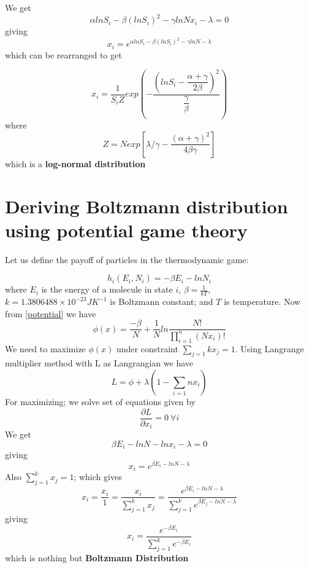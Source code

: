 \documentclass[letterpaper,english,10pt]{article}
\begin{document}
 We get 
 \begin{equation}
    \alpha ln S_i-\beta (ln S_i)^2 - \gamma ln Nx_i - \lambda = 0
 \end{equation}
 giving
 \begin{equation}
     x_i = e ^ {\alpha ln S_i - \beta (ln S_i)^2 - \gamma ln N -\lambda}
 \end{equation}
 which can be rearranged to get
 
 \begin{equation}\label{fairpotential}
     x_i = \dfrac{1}{S_i Z}exp(-\dfrac{(lnS_i - \dfrac{\alpha+\gamma}{2\beta})^2 }{\dfrac{\gamma}{\beta}})
 \end{equation}
 where 
 \begin{equation}
     Z = N exp[\lambda/\gamma - \dfrac{(\alpha + \gamma)^2}{4\beta \gamma}]
 \end{equation}
 which is a \textbf{log-normal distribution}
 

\section{Deriving Boltzmann distribution using potential game theory}
Let us define the payoff of particles in the thermodynamic game:

\begin{equation}\label{thermogame}
    h_i(E_i,N_i) = -\beta E_i - ln N_i
\end{equation}
where $E_i$ is the energy of a molecule in state $i$, $\beta=\frac{1}{kT}$, $k=1.3806488 \times 10^{-23} JK^{-1}$ is Boltzmann constant; and $T$ is temperature.
 Now from \ref{potential} we have 
 \begin{equation}
 \phi(x) = \frac{-\beta}{N}+ \frac{1}{N}ln\frac{N!}{\prod_{i=1}^{n}(Nx_i)!}
 \end{equation}
 We need to maximize $\phi(x)$ under constraint $\sum_{j=1}{k}x_j = 1$.
 Using Langrange multiplier method with L as Langrangian we have
 \begin{equation}
     L=\phi + \lambda(1-\sum_{i=1}{n}x_i)
 \end{equation}
 For maximizing; we solve set of equations given by
 \begin{equation}
     \frac{\partial L}{\partial x_i} =0 ~ \forall i
 \end{equation}
 We get 
 \begin{equation}
     \beta E_i  - ln N - ln x_i -\lambda = 0 
 \end{equation}
 giving
 \begin{equation}
     x_i = e ^ {\beta E_i  - ln N  -\lambda}
 \end{equation}
 Also $\sum_{j=1}^{k}x_j=1$; which gives
 \begin{equation}
     x_i = \frac{x_i}{1} = \frac{x_i}{\sum_{j=1}^{k}x_j} = \frac{e ^ {\beta E_i  - ln N  -\lambda}}{\sum_{j=1}^{k}e ^ {\beta E_j  - ln N  -\lambda}}
 \end{equation}
 giving
 \begin{equation}
     x_i = \frac{e^{-\beta E_i}}{\sum_{j=1}^{k}e^{-\beta E_i}}
 \end{equation}
 which is nothing but \textbf{Boltzmann Distribution}
 
\end{document}
